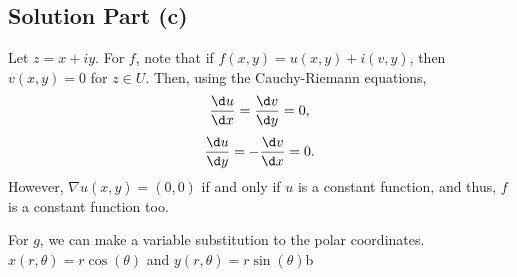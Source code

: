 \subsection*{Solution Part (c)}
Let $z = x+iy$. For $f$, note that if $f(x,y) = u(x,y)+i(v,y)$, then $v(x,y) = 0$ for $z \in U$. Then, using the Cauchy-Riemann equations,
\[ \frac{\d u}{\d x} = \frac{\d v}{\d y} = 0, \]
\[ \frac{\d u}{\d y} = -\frac{\d v}{\d x} = 0. \]
However, $\nabla u(x,y) = (0,0)$ if and only if $u$ is a constant function, and thus, $f$ is a constant function too.

For $g$, we can make a variable substitution to the polar coordinates. $x(r,\theta) = r\cos(\theta)$ and $y(r,\theta) = r\sin(\theta)$b